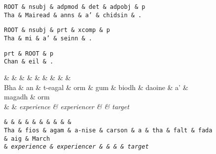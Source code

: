 \documentclass[a4paper]{article}
\begin{document}
\begin{figure}
\begin{center}
\begin{dependency}
\begin{deptext}
\tt ROOT \& \tt nsubj \& \tt adpmod \& \tt det \& \tt adpobj \& \tt p\\
Tha \& Mairead \& anns \& a' \& chidsin \& . \\
\end{deptext}
\end{dependency}
\begin{dependency}
\begin{deptext}
\tt ROOT \& \tt nsubj \& \tt prt \& \tt xcomp \& p\\
Tha \& mi \& a' \& seinn \& .\\
\end{deptext}
\end{dependency}
\begin{dependency}
\begin{deptext}
\tt prt \& \tt ROOT \& \tt p\\
Chan \& eil \& . \\
\end{deptext}
\end{dependency}
\begin{dependency}
\begin{deptext}
\ROOT \& \deter \& \nsubj \& \adpmod \& \marker \& \ccomp \& \nsubj \& \prt \& \xcomp \& \adpmod\\
Bha \& an \& t-eagal \& orm \& gum \& biodh \& daoine \& a' \& magadh \& orm\\
    \& \& \it experience \& \it experiencer \& \& \it target\\
\end{deptext}
\end{dependency}
\begin{dependency}
\begin{deptext}
\tt \ROOT \& \tt \nsubj \& \tt \adpmod \& \tt \advmod \& \tt \advmod \& \tt \prt \& \tt \ccomp \& \tt \nsubj \& \tt \amod \& \tt \adpmod \& \tt \adpobj \\
Tha \& fios \& agam \& a-nise \& carson \& a \& tha \& falt \& fada \& aig \& March\\
    \& \it experience \& \it experiencer \& \& \& \& \it target \\
\end{deptext}
\end{dependency}


\end{center}
\end{figure}
\end{document}
